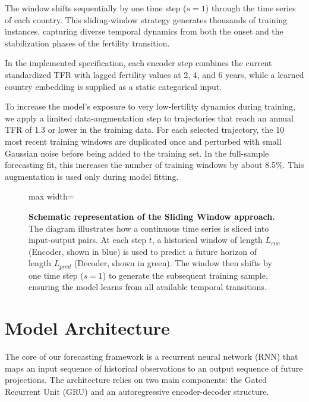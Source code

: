 \documentclass[12pt]{article}
\begin{document}
The window shifts sequentially by one time step ($s=1$) through the time series of each country. This sliding-window strategy generates thousands of training instances, capturing diverse temporal dynamics from both the onset and the stabilization phases of the fertility transition.

In the implemented specification, each encoder step combines the current standardized TFR with lagged fertility values at 2, 4, and 6 years, while a learned country embedding is supplied as a static categorical input.

To increase the model's exposure to very low-fertility dynamics during training, we apply a limited data-augmentation step to trajectories that reach an annual TFR of 1.3 or lower in the training data. For each selected trajectory, the 10 most recent training windows are duplicated once and perturbed with small Gaussian noise before being added to the training set. In the full-sample forecasting fit, this increases the number of training windows by about 8.5\%. This augmentation is used only during model fitting.

\begin{figure}[h!]
	\centering
	\begin{adjustbox}{max width=\linewidth}
	
	\end{adjustbox}
	\caption[Sliding Window Approach]{\textbf{Schematic representation of the Sliding Window approach.} The diagram illustrates how a continuous time series is sliced into input-output pairs. At each step $t$, a historical window of length $L_{enc}$ (Encoder, shown in blue) is used to predict a future horizon of length $L_{pred}$ (Decoder, shown in green). The window then shifts by one time step ($s=1$) to generate the subsequent training sample, ensuring the model learns from all available temporal transitions.}
	\label{fig:win_sld}
\end{figure}


\section{Model Architecture}

The core of our forecasting framework is a recurrent neural network (RNN) that maps an input sequence of historical observations to an output sequence of future projections. The architecture relies on two main components: the Gated Recurrent Unit (GRU) and an autoregressive encoder-decoder structure.
\end{document}
